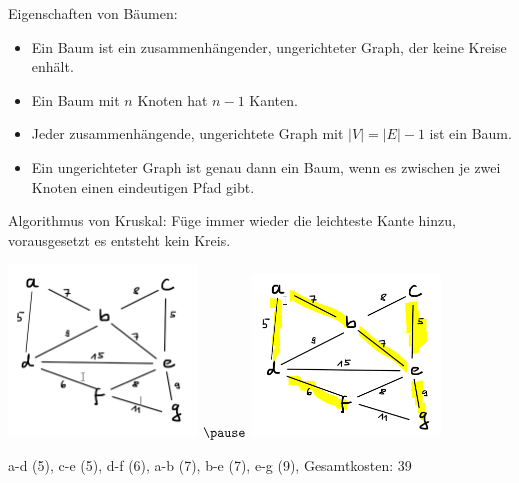 \begin{frame}[fragile]
Eigenschaften von Bäumen:

\begin{itemize}
\item Ein Baum ist ein zusammenhängender, ungerichteter Graph, der keine Kreise enhält.

\item Ein Baum mit $n$ Knoten hat $n-1$ Kanten.

\item Jeder zusammenhängende, ungerichtete Graph mit $\left|V\right| = \left|E\right| - 1$ ist ein Baum.

\item Ein ungerichteter Graph ist genau dann ein Baum, wenn es zwischen je zwei Knoten einen eindeutigen Pfad gibt.

\end{itemize}
\end{frame}

\begin{frame}[fragile]
Algorithmus von Kruskal: Füge immer wieder die leichteste Kante hinzu, vorausgesetzt es entsteht kein Kreis.

\includegraphics[width=5cm]{kruskal_03.png} $\pause$
\includegraphics[width=5cm]{kruskal_03_mst.png}  

a-d (5), c-e (5), d-f (6), a-b (7), b-e (7), e-g (9), Gesamtkosten:  39

\end{frame}

